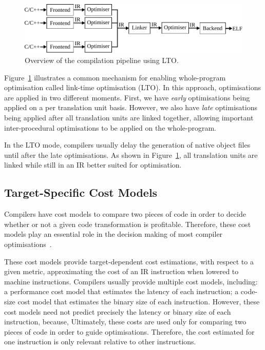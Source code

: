 \begin{figure}[h]
  \centering
  \includegraphics[scale=0.85]{src/background/figs/full-pipeline-LTO.pdf}
  \caption{Overview of the compilation pipeline using LTO.}
  \label{fig:full-LTO-pipeline}
\end{figure}

Figure~\ref{fig:full-LTO-pipeline} illustrates a common mechanism for enabling whole-program optimisation called link-time optimisation (LTO).
In this approach, optimisations are applied in two different moments.
First, we have \textit{early} optimisations being applied on a per translation unit basis.
However, we also have \textit{late} optimisations being applied after all translation units are linked together, allowing important inter-procedural optimisations to be applied on the whole-program.

In the LTO mode, compilers usually delay the generation of native object files until after the late optimisations.
As shown in Figure~\ref{fig:full-LTO-pipeline}, all translation units are linked while still in an IR better suited for optimisation.

\subsection{Target-Specific Cost Models} \label{sec:background:costmodel}

Compilers have cost models to compare two pieces of code in order to decide whether or not a given code transformation is profitable.
Therefore, these cost models play an essential role in the decision making of most compiler optimisations~\cite{porpodas18b,pohl18}.

These cost models provide target-dependent cost estimations, with respect to a given metric, 
approximating the cost of an IR instruction when lowered to machine instructions.
Compilers usually provide multiple cost models, including: a performance cost model that estimates the latency of each instruction; a code-size cost model that estimates the binary size of each instruction.
However, these cost models need not predict precisely the latency or binary size of each instruction, because, Ultimately, these costs are used only for comparing two pieces of code in order to guide optimisations.
Therefore, the cost estimated for one instruction is only relevant relative to other instructions.

